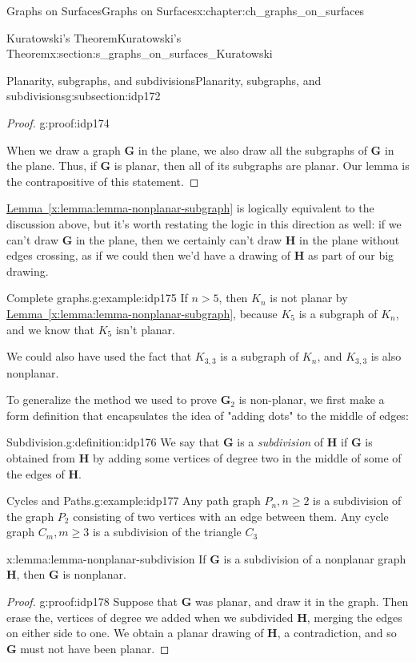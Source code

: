 \documentclass[oneside,10pt,]{book}
\newcommand{\xreffont}{\relax}
\numberwithin{equation}{section}
\newcommand{\bfG}{\mathbf{G}}
\newcommand{\bfH}{\mathbf{H}}
\newcommand{\gt}{>}
\begin{document}
\begin{chapterptx}{Graphs on Surfaces}{}{Graphs on Surfaces}{}{}{x:chapter:ch_graphs_on_surfaces}
\begin{sectionptx}{Kuratowski's Theorem}{}{Kuratowski's Theorem}{}{}{x:section:s_graphs_on_surfaces_Kuratowski}
\begin{subsectionptx}{Planarity, subgraphs, and subdivisions}{}{Planarity, subgraphs, and subdivisions}{}{}{g:subsection:idp172}
\begin{proof}{}{g:proof:idp174}
\par
When we draw a graph \(\bfG\) in the plane, we also draw all the subgraphs of \(\bfG\) in the plane.  Thus, if \(\bfG\) is planar, then all of its subgraphs are planar.  Our lemma is the contrapositive of this statement.%
\end{proof}
\hyperref[x:lemma:lemma-nonplanar-subgraph]{Lemma~{\xreffont\ref{x:lemma:lemma-nonplanar-subgraph}}} is logically equivalent to the discussion above, but it's worth restating the logic in this direction as well: if we can't draw \(\bfG\) in the plane, then we certainly can't draw \(\bfH\) in the plane without edges crossing, as if we could then we'd have a drawing of \(\bfH\) as part of our big drawing.%
\begin{example}{Complete graphs.}{g:example:idp175}%
If \(n\gt 5\), then \(K_n\) is not planar by \hyperref[x:lemma:lemma-nonplanar-subgraph]{Lemma~{\xreffont\ref{x:lemma:lemma-nonplanar-subgraph}}}, because \(K_5\) is a subgraph of \(K_n\), and we know that \(K_5\) isn't planar.%
\par
We could also have used the fact that \(K_{3,3}\) is a subgraph of \(K_n\), and \(K_{3,3}\) is also nonplanar.%
\end{example}
To generalize the method we used to prove \(\bfG_2\) is non-planar, we first make a form definition that encapsulates the idea of "adding dots" to the middle of edges:%
\begin{definition}{Subdivision.}{g:definition:idp176}%
We say that \(\bfG\) is a \emph{subdivision} of \(\bfH\) if \(\bfG\) is obtained from \(\bfH\) by adding some vertices of degree two in the middle of some of the edges of \(\bfH\).%
\end{definition}
\begin{example}{Cycles and Paths.}{g:example:idp177}%
Any path graph \(P_n, n\geq 2\) is a subdivision of the graph \(P_2\) consisting of two vertices with an edge between them.  Any cycle graph \(C_m, m\geq 3\) is a subdivision of the triangle \(C_3\)%
\end{example}
\begin{lemma}{}{}{x:lemma:lemma-nonplanar-subdivision}%
If \(\bfG\) is a subdivision of a nonplanar graph \(\bfH\), then \(\bfG\) is nonplanar.%
\end{lemma}
\begin{proof}{}{g:proof:idp178}
Suppose that \(\bfG\) was planar, and draw it in the graph.  Then erase the, vertices of degree we added when we subdivided \(\bfH\), merging the edges on either side to one.  We obtain a planar drawing of \(\bfH\), a contradiction, and so \(\bfG\) must not have been planar.%

\end{proof}
\end{subsectionptx}
\end{sectionptx}
\end{chapterptx}
\end{document}
